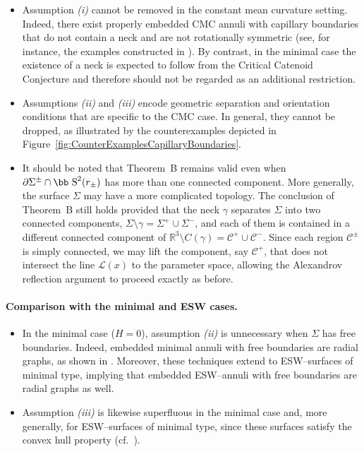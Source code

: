 \documentclass[11pt]{article}
\def\s{\hbox{\bb S}}
\numberwithin{equation} {section}
\begin{document}
\begin{itemize}
\item
Assumption {\it (i)} cannot be removed in the constant mean curvature setting.
Indeed, there exist properly embedded CMC annuli with capillary boundaries
that do not contain a neck and are not rotationally symmetric
(see, for instance, the examples constructed in \cite{CMF,FHM}).
By contrast, in the minimal case the existence of a neck is expected to follow
from the Critical Catenoid Conjecture and therefore should not be regarded as
an additional restriction.

\item
Assumptions {\it (ii)} and {\it (iii)} encode geometric separation and orientation
conditions that are specific to the CMC case.
In general, they cannot be dropped, as illustrated by the counterexamples
depicted in Figure~\ref{fig:CounterExamplesCapillaryBoundaries}.

\item 
It should be noted that Theorem~B remains valid even when 
$\partial \Sigma^\pm \cap \s^2(r_\pm)$ has more than one connected component.
More generally, the surface $\Sigma$ may have a more complicated topology.
The conclusion of Theorem~B still holds provided that the neck $\gamma$
separates $\Sigma$ into two connected components, $\Sigma \setminus \gamma = \Sigma^+ \cup \Sigma^-$, and each of them is contained in a different connected component of $\mathbb{R}^3 \setminus C(\gamma) = \mathcal C^+ \cup \mathcal C^-$. Since each region $\mathcal C^\pm$ is simply connected, we may lift the
component, say $\mathcal C^+$, that does not intersect the line
$\mathcal L(x)$ to the parameter space, allowing the Alexandrov reflection
argument to proceed exactly as before.
\end{itemize}



\paragraph{Comparison with the minimal and ESW cases.}

\begin{itemize}
\item
In the minimal case ($H=0$), assumption {\it (ii)} is unnecessary when $\Sigma$ has free boundaries.
Indeed, embedded minimal annuli with free boundaries are radial graphs, as shown
in \cite{EMa}.
Moreover, these techniques extend to ESW--surfaces of minimal type, implying
that embedded ESW--annuli with free boundaries are radial graphs as well.

\item
Assumption {\it (iii)} is likewise superfluous in the minimal case and, more
generally, for ESW--surfaces of minimal type, since these surfaces satisfy the
convex hull property (cf.~\cite{AEG}).
\end{itemize}
\end{document}
